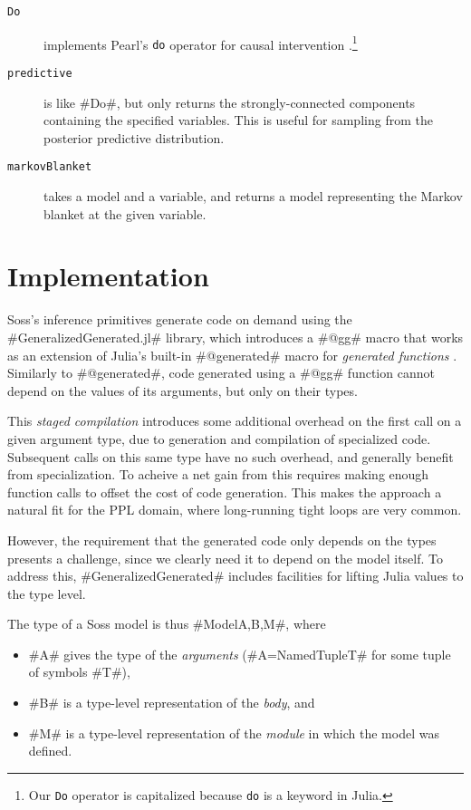 \documentclass[anonymous=false, %
               format=acmsmall, %
               review=true, %
               screen=true, %
               nonacm=true]{acmart}
\begin{document}
\begin{description}
    \item[\texttt{Do}] implements Pearl's {\footnotesize\texttt{do}} operator for causal intervention \cite{Pearl1995}.\footnote{Our {\footnotesize\texttt{Do}} operator is capitalized because {\footnotesize\texttt{do}} is a keyword in Julia.}
    \item[\texttt{predictive}] is like \jl#Do#, but only returns the strongly-connected components containing the specified variables. This is useful for sampling from the posterior predictive distribution.
    \item[\texttt{markovBlanket}]  takes a model and a variable, and returns a model representing the Markov blanket at the given variable.
\end{description}

\section{Implementation}

Soss's inference primitives generate code on demand using the \jl#GeneralizedGenerated.jl# library, which introduces a \jl#@gg# macro that works as an extension of Julia's built-in \jl#@generated# macro for \emph{generated functions} \cite{bezanson2012julia}. Similarly to \jl#@generated#, code generated using a \jl#@gg# function cannot depend on the values of its arguments, but only on their types. 

This \emph{staged compilation} introduces some additional overhead on the first call on a given argument type, due to generation and compilation of specialized code. Subsequent calls on this same type have no such overhead, and generally benefit from specialization. To acheive a net gain from this requires making enough function calls to offset the cost of code generation. This makes the approach a natural fit for the PPL domain, where long-running tight loops are very common. 

However, the requirement that the generated code only depends on the types presents a challenge, since we clearly need it to depend on the model itself. To address this, \jl#GeneralizedGenerated# includes facilities for lifting Julia values to the type level. 

The type of a Soss model is thus \jl#Model{A,B,M}#, where 
\begin{itemize}
    \item \jl#A# gives the type of the \emph{arguments} (\jl#A=NamedTuple{T}# for some tuple of symbols \jl#T#),
    \item \jl#B# is a type-level representation of the \emph{body}, and
    \item \jl#M# is a type-level representation of the \emph{module} in which the model was defined.
\end{itemize}
\end{document}
